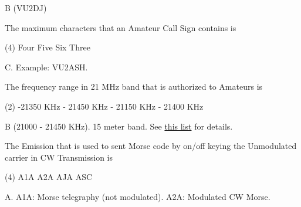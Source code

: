 \documentclass[a4paper]{article}
\begin{document}
\begin{solution}
	B (VU2DJ)
\end{solution}

\vspace{5mm}



\begin{question}The maximum characters that an Amateur Call Sign contains is \spaces
	\begin{tasks}(4)
		\task Four
		\task Five
		\task Six
		\task Three
	\end{tasks}
\end{question}

\begin{solution}
	C. Example: VU2ASH.
\end{solution}

\vspace{5mm}



\begin{question}The frequency range in 21 MHz band that is authorized to Amateurs is \spaces
	\begin{tasks}(2)
		 -21350 KHz
		 - 21450 KHz
		 - 21150 KHz
		 - 21400 KHz
	\end{tasks}
\end{question}

\begin{solution}
	B (21000 - 21450 KHz). 15 meter band. See \href{https://en.wikipedia.org/wiki/List_of_amateur_radio_frequency_bands_in_India}{this list} for details.
\end{solution}

\vspace{5mm}



\begin{question}The Emission that is used to sent Morse code by on/off keying the Unmodulated carrier in CW Transmission is \spaces
	\begin{tasks}(4)
		\task A1A
		\task A2A
		\task AJA
		\task ASC
	\end{tasks}
\end{question}

\begin{solution}
	A. A1A: Morse telegraphy (not modulated). A2A: Modulated CW Morse.
\end{solution}

\vspace{5mm}
\end{document}
